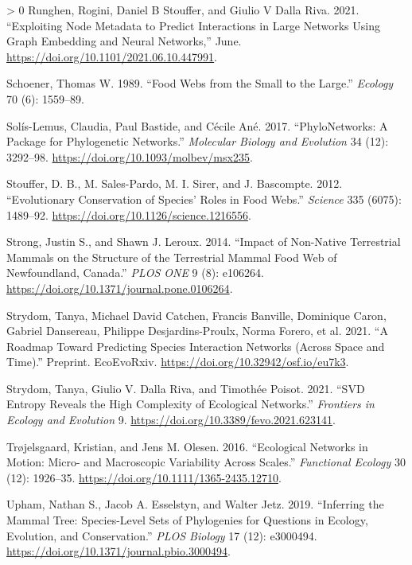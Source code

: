 \documentclass[11pt]{article}
\newlength{\cslhangindent}
\newenvironment{CSLReferences}[3] %
 {%
  \setlength{\parindent}{0pt}
  \ifodd #1 \everypar{\setlength{\hangindent}{\cslhangindent}}\ignorespaces\fi
  \ifnum #2 > 0
  \setlength{\parskip}{#2\baselineskip}
  \fi
 }%
 {}
\begin{document}
\begin{CSLReferences}{1}{0}
\leavevmode\hypertarget{ref-Runghen2021ExpNod}{}%
Runghen, Rogini, Daniel B Stouffer, and Giulio V Dalla Riva. 2021.
{``Exploiting Node Metadata to Predict Interactions in Large Networks
Using Graph Embedding and Neural Networks,''} June.
\url{https://doi.org/10.1101/2021.06.10.447991}.

\leavevmode\hypertarget{ref-Schoener1989FooWeb}{}%
Schoener, Thomas W. 1989. {``Food Webs from the Small to the Large.''}
\emph{Ecology} 70 (6): 1559--89.

\leavevmode\hypertarget{ref-Solis-Lemus2017PhyPac}{}%
Solís-Lemus, Claudia, Paul Bastide, and Cécile Ané. 2017.
{``PhyloNetworks: A Package for Phylogenetic Networks.''}
\emph{Molecular Biology and Evolution} 34 (12): 3292--98.
\url{https://doi.org/10.1093/molbev/msx235}.

\leavevmode\hypertarget{ref-Stouffer2012EvoCona}{}%
Stouffer, D. B., M. Sales-Pardo, M. I. Sirer, and J. Bascompte. 2012.
{``Evolutionary Conservation of Species' Roles in Food Webs.''}
\emph{Science} 335 (6075): 1489--92.
\url{https://doi.org/10.1126/science.1216556}.

\leavevmode\hypertarget{ref-Strong2014ImpNona}{}%
Strong, Justin S., and Shawn J. Leroux. 2014. {``Impact of Non-Native
Terrestrial Mammals on the Structure of the Terrestrial Mammal Food Web
of Newfoundland, Canada.''} \emph{PLOS ONE} 9 (8): e106264.
\url{https://doi.org/10.1371/journal.pone.0106264}.

\leavevmode\hypertarget{ref-Strydom2021RoaPre}{}%
Strydom, Tanya, Michael David Catchen, Francis Banville, Dominique
Caron, Gabriel Dansereau, Philippe Desjardins-Proulx, Norma Forero, et
al. 2021. {``A Roadmap Toward Predicting Species Interaction Networks
(Across Space and Time).''} Preprint. EcoEvoRxiv.
\url{https://doi.org/10.32942/osf.io/eu7k3}.

\leavevmode\hypertarget{ref-Strydom2021SvdEnt}{}%
Strydom, Tanya, Giulio V. Dalla Riva, and Timothée Poisot. 2021. {``SVD
Entropy Reveals the High Complexity of Ecological Networks.''}
\emph{Frontiers in Ecology and Evolution} 9.
\url{https://doi.org/10.3389/fevo.2021.623141}.

\leavevmode\hypertarget{ref-Trojelsgaard2016EcoNet}{}%
Trøjelsgaard, Kristian, and Jens M. Olesen. 2016. {``Ecological Networks
in Motion: Micro- and Macroscopic Variability Across Scales.''}
\emph{Functional Ecology} 30 (12): 1926--35.
\url{https://doi.org/10.1111/1365-2435.12710}.

\leavevmode\hypertarget{ref-Upham2019InfMam}{}%
Upham, Nathan S., Jacob A. Esselstyn, and Walter Jetz. 2019.
{``Inferring the Mammal Tree: Species-Level Sets of Phylogenies for
Questions in Ecology, Evolution, and Conservation.''} \emph{PLOS
Biology} 17 (12): e3000494.
\url{https://doi.org/10.1371/journal.pbio.3000494}.


\end{CSLReferences}
\end{document}
